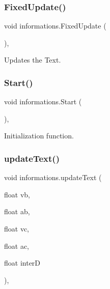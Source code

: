 \subsubsection{\texorpdfstring{Fixed\+Update()}{FixedUpdate()}}
{\footnotesize\ttfamily void informations.\+Fixed\+Update (\begin{DoxyParamCaption}{ }\end{DoxyParamCaption})\hspace{0.3cm}{\ttfamily [inline]}, {\ttfamily [private]}}



Updates the Text. 

\mbox{\label{classinformations_adbca1b4eb5f7fc762725261b2469ee62}} 
\subsubsection{\texorpdfstring{Start()}{Start()}}
{\footnotesize\ttfamily void informations.\+Start (\begin{DoxyParamCaption}{ }\end{DoxyParamCaption})\hspace{0.3cm}{\ttfamily [inline]}, {\ttfamily [private]}}



Initialization function. 

\mbox{\label{classinformations_a6cbc72bf9a7cccdc906bc6ec0b0b870c}} 
\subsubsection{\texorpdfstring{update\+Text()}{updateText()}}
{\footnotesize\ttfamily void informations.\+update\+Text (\begin{DoxyParamCaption}\item[{float}]{vb,  }\item[{float}]{ab,  }\item[{float}]{vc,  }\item[{float}]{ac,  }\item[{float}]{interD }\end{DoxyParamCaption})\hspace{0.3cm}{\ttfamily [inline]}, {\ttfamily [private]}}



